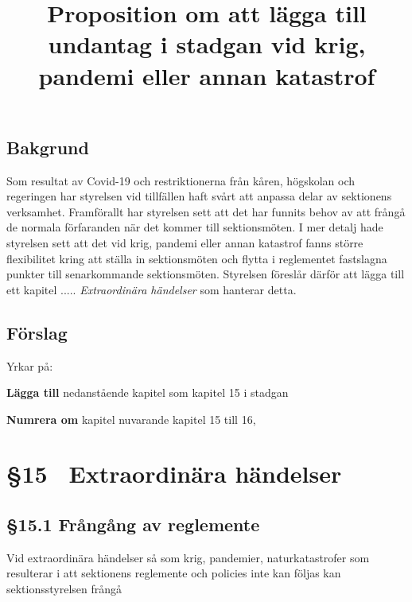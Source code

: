 \documentclass[11pt, noincludeaddress, nopagination]{classes/cthit}
\begin{document}
\title{Proposition om att lägga till undantag i stadgan vid krig, pandemi eller annan katastrof}

\makeheadfoot%

\makesimpletitle

\subsection*{Bakgrund}
Som resultat av Covid-19 och restriktionerna från kåren, högskolan och regeringen har styrelsen vid tillfällen haft svårt att anpassa delar av sektionens verksamhet. Framförallt har styrelsen sett att det har funnits behov av att frångå de normala förfaranden när det kommer till sektionsmöten. I mer detalj hade styrelsen sett att det vid krig, pandemi eller annan katastrof fanns större flexibilitet kring att ställa in sektionsmöten och flytta i reglementet fastslagna punkter till senarkommande sektionsmöten. Styrelsen föreslår därför att lägga till ett kapitel ..... \textit{Extraordinära händelser} som hanterar detta. 
\subsection*{Förslag}
Yrkar på:
\begin{att}
    \item \textbf{Lägga till} nedanstående kapitel som kapitel 15 i stadgan
    \item \textbf{Numrera om} kapitel nuvarande kapitel 15 till 16, 
\end{att}
\newpage

\section*{§15~ Extraordinära händelser}
\subsection*{§15.1 Frångång av reglemente}
Vid extraordinära händelser så som krig, pandemier, naturkatastrofer som resulterar i att sektionens reglemente och policies inte kan följas kan sektionsstyrelsen frångå 
\end{document}
